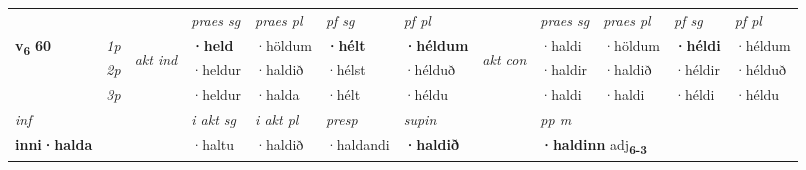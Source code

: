 \begin{longtable}[l]{X>{\footnotesize\itshape}llXXXXlXXXX}
 & &   & \textit{praes sg}  & \textit{praes pl}    & \textit{ pf sg} & \textit{pf pl} & & \textit{praes sg}  & \textit{praes pl}    & \textit{pf sg} & \textit{pf pl }  \\ \cmidrule{4-7} \cmidrule{9-12}
 \multirow{2}{*}{{{\textbf{v{\textsubscript{6}}} \Large{\textbf{60}}}}}  & 1p & \multirow{3}{*}{\begin{turn}{90}\textit{akt ind}\end{turn}} & \textbf{·held} & ·höldum & \textbf{·hélt} & \textbf{·héldum} & \multirow{3}{*}{\begin{turn}{90}\textit{akt con}\end{turn}} &·haldi & ·höldum & \textbf{·héldi} & ·héldum\\*
 & 2p &  &  ·heldur  & ·haldið & ·hélst & ·hélduð & & ·haldir & ·haldið & ·héldir & ·hélduð \\*
 & 3p &  & ·heldur & ·halda & ·hélt & ·héldu & & ·haldi & ·haldi& ·héldi & ·héldu \\*
\cmidrule{4-7} \cmidrule{9-12}

   {\textit{inf}} & &  & \textit{i akt sg} & \textit{i akt pl}   & \textit{presp} & \textit{supin}  && \textit{pp m} \\*
  {\textbf{inni\allowbreak ·halda}} & && ·haltu  & ·haldið   & ·haldandi &  \textbf{·haldið}  && \multicolumn{2}{l}{\textbf{·haldinn} adj\textbf{\textsubscript{6-3}}} \\*


\end{longtable}
